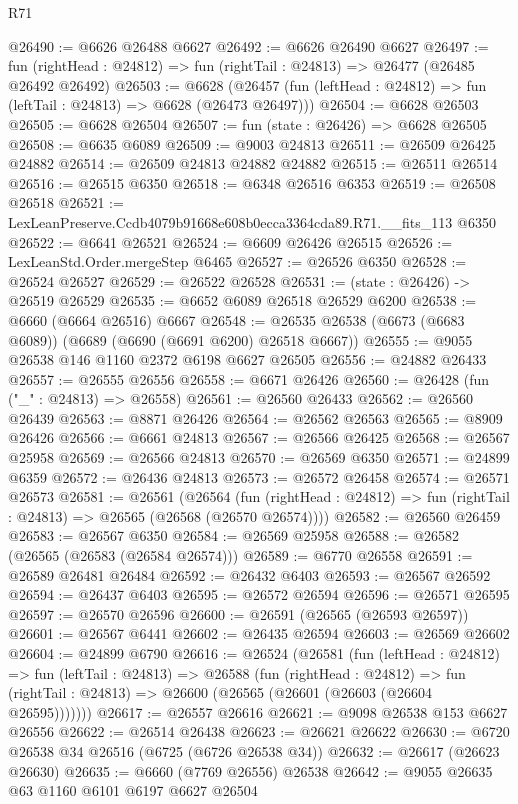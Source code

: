 \begin{lexlean}{R71}
\begin{coremodule}
@26490 := @6626 @26488 @6627
@26492 := @6626 @26490 @6627
@26497 := fun (rightHead : @24812) => fun (rightTail : @24813) => @26477 (@26485 @26492 @26492)
@26503 := @6628
    (@26457 (fun (leftHead : @24812) => fun (leftTail : @24813) => @6628 (@26473 @26497)))
@26504 := @6628 @26503
@26505 := @6628 @26504
@26507 := fun (state : @26426) => @6628 @26505
@26508 := @6635 @6089
@26509 := @9003 @24813
@26511 := @26509 @26425 @24882
@26514 := @26509 @24813 @24882 @24882
@26515 := @26511 @26514
@26516 := @26515 @6350
@26518 := @6348 @26516 @6353
@26519 := @26508 @26518
@26521 := LexLeanPreserve.Ccdb4079b91668e608b0ecca3364cda89.R71.__fits_113 @6350
@26522 := @6641 @26521
@26524 := @6609 @26426 @26515
@26526 := LexLeanStd.Order.mergeStep @6465
@26527 := @26526 @6350
@26528 := @26524 @26527
@26529 := @26522 @26528
@26531 := (state : @26426) -> @26519 @26529
@26535 := @6652 @6089 @26518 @26529 @6200
@26538 := @6660 (@6664 @26516) @6667
@26548 := @26535 @26538 (@6673 (@6683 @6089)) (@6689 (@6690 (@6691 @6200) @26518 @6667))
@26555 := @9055 @26538 @146 @1160 @2372 @6198 @6627 @26505
@26556 := @24882 @26433
@26557 := @26555 @26556
@26558 := @6671 @26426
@26560 := @26428 (fun ("_" : @24813) => @26558)
@26561 := @26560 @26433
@26562 := @26560 @26439
@26563 := @8871 @26426
@26564 := @26562 @26563
@26565 := @8909 @26426
@26566 := @6661 @24813
@26567 := @26566 @26425
@26568 := @26567 @25958
@26569 := @26566 @24813
@26570 := @26569 @6350
@26571 := @24899 @6359
@26572 := @26436 @24813
@26573 := @26572 @26458
@26574 := @26571 @26573
@26581 := @26561
    (@26564
      (fun (rightHead : @24812) => fun (rightTail : @24813) => @26565 (@26568 (@26570 @26574))))
@26582 := @26560 @26459
@26583 := @26567 @6350
@26584 := @26569 @25958
@26588 := @26582 (@26565 (@26583 (@26584 @26574)))
@26589 := @6770 @26558
@26591 := @26589 @26481 @26484
@26592 := @26432 @6403
@26593 := @26567 @26592
@26594 := @26437 @6403
@26595 := @26572 @26594
@26596 := @26571 @26595
@26597 := @26570 @26596
@26600 := @26591 (@26565 (@26593 @26597))
@26601 := @26567 @6441
@26602 := @26435 @26594
@26603 := @26569 @26602
@26604 := @24899 @6790
@26616 := @26524
    (@26581
      (fun (leftHead : @24812) =>
      fun (leftTail : @24813) =>
      @26588
        (fun (rightHead : @24812) =>
        fun (rightTail : @24813) => @26600 (@26565 (@26601 (@26603 (@26604 @26595)))))))
@26617 := @26557 @26616
@26621 := @9098 @26538 @153 @6627 @26556
@26622 := @26514 @26438
@26623 := @26621 @26622
@26630 := @6720 @26538 @34 @26516 (@6725 (@6726 @26538 @34))
@26632 := @26617 (@26623 @26630)
@26635 := @6660 (@7769 @26556) @26538
@26642 := @9055 @26635 @63 @1160 @6101 @6197 @6627 @26504

\end{coremodule}
\end{lexlean}
